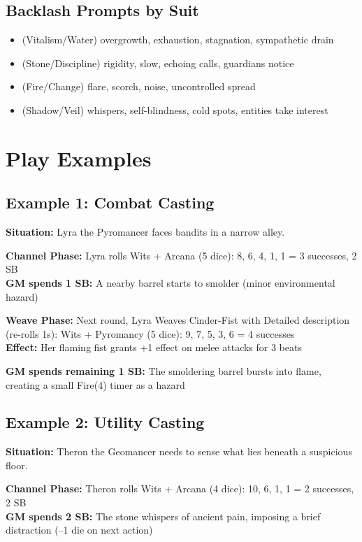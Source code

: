 \documentclass[11pt]{report}
\begin{document}
\subsection{Backlash Prompts by Suit}
\begin{itemize}
    \item \heartsuit (Vitalism/Water) overgrowth, exhaustion, stagnation, sympathetic drain
    \item \clubsuit (Stone/Discipline) rigidity, slow, echoing calls, guardians notice
    \item \diamondsuit (Fire/Change) flare, scorch, noise, uncontrolled spread
    \item \spadesuit (Shadow/Veil) whispers, self-blindness, cold spots, entities take interest
\end{itemize}

\section{Play Examples}

\subsection{Example 1: Combat Casting}
\textbf{Situation:} Lyra the Pyromancer faces bandits in a narrow alley.

\textbf{Channel Phase:} Lyra rolls Wits + Arcana (5 dice): 8, 6, 4, 1, 1 = 3 successes, 2 SB\\
\textbf{GM spends 1 SB:} A nearby barrel starts to smolder (minor environmental hazard)

\textbf{Weave Phase:} Next round, Lyra Weaves Cinder-Fist with Detailed description (re-rolls 1s): Wits + Pyromancy (5 dice): 9, 7, 5, 3, 6 = 4 successes\\
\textbf{Effect:} Her flaming fist grants +1 effect on melee attacks for 3 beats

\textbf{GM spends remaining 1 SB:} The smoldering barrel bursts into flame, creating a small Fire(4) timer as a hazard

\subsection{Example 2: Utility Casting}
\textbf{Situation:} Theron the Geomancer needs to sense what lies beneath a suspicious floor.

\textbf{Channel Phase:} Theron rolls Wits + Arcana (4 dice): 10, 6, 1, 1 = 2 successes, 2 SB\\
\textbf{GM spends 2 SB:} The stone whispers of ancient pain, imposing a brief distraction (--1 die on next action)
\end{document}
